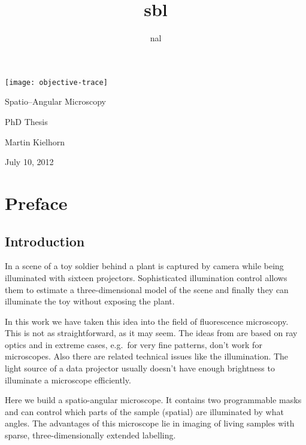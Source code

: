 \documentclass[oneside,a4paper,12pt,BCOR20mm,DIV14]{scrbook}
\title{sbl}
\author{nal}
\begin{document}
\listoftodos
\begin{titlepage}
  
  \hspace{-4cm}
  \texttt{[image: objective-trace]}



  \vspace{-5cm}
  
  \hspace{4cm}\textsf{\Huge Spatio--Angular Microscopy}
  
  \vspace{2cm}
  \hspace{6cm}\textsf{\huge PhD Thesis}


  \vspace{3cm}
  \hspace{4cm}\textsf{\Large Martin Kielhorn}
  
  \vspace{1cm}
  \hspace{4cm}\textsf{\Large July 10, 2012}
\end{titlepage}
\newpage

\section*{Preface}
\subsection*{Introduction}
In \citet{Levoy2003} a scene of a toy soldier behind a plant is
captured by camera while being illuminated with sixteen projectors.
Sophisticated illumination control allows them to estimate a
three-dimensional model of the scene and finally they can illuminate
the toy without exposing the plant.

In this work we have taken this idea into the field of fluorescence
microscopy. This is not as straightforward, as it may seem.  The ideas
from \citet{Levoy2003} are based on ray optics and in extreme cases,
e.g.\ for very fine patterns, don't work for microscopes. Also there
are related technical issues like the illumination. The light source
of a data projector usually doesn't have enough brightness to
illuminate a microscope efficiently.

Here we build a spatio-angular microscope. It contains two
programmable masks and can control which parts of the sample (spatial)
are illuminated by what angles. The advantages of this microscope lie
in imaging of living samples with sparse, three-dimensionally extended
labelling.
\end{document}
